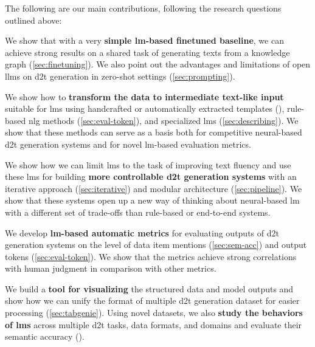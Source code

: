 The following are our main contributions, following the research questions outlined above:

\begin{description}[leftmargin=\widthof{\textbf{Ad RQ1\ \ }}]
  \item[Ad \ref{rq:1}] We show that  with a very \textbf{simple \ac{lm}-based finetuned baseline}, we can achieve strong results on a shared task of generating texts from a knowledge graph (\autoref{sec:finetuning}). We also point out the advantages and limitations of open \acp{llm} on \ac{d2t} generation in zero-shot settings (\autoref{sec:prompting}).
  \item[Ad \ref{rq:2}] We show how to \textbf{transform the data to intermediate text-like input} suitable for \acp{lm} using handcrafted or automatically extracted templates (), rule-based \ac{nlg} methods (\autoref{sec:eval-token}), and specialized \acp{lm} (\autoref{sec:describing}). We show that these methods can serve as a basis both for competitive neural-based \ac{d2t} generation systems and for novel \ac{lm}-based evaluation metrics.
  \item[Ad \ref{rq:3}] We show how we can limit \acp{lm} to the task of improving text fluency and use these \acp{lm} for building \textbf{more controllable \ac{d2t} generation systems} with an iterative approach (\autoref{sec:iterative}) and modular architecture (\autoref{sec:pipeline}). We show that these systems open up a new way of thinking about neural-based \ac{lm} with a different set of trade-offs than rule-based or end-to-end systems.
  \item[Ad \ref{rq:4}] We develop \textbf{\ac{lm}-based automatic metrics} for evaluating outputs of \ac{d2t} generation systems on the level of data item mentions (\autoref{sec:sem-acc}) and output tokens (\autoref{sec:eval-token}). We show that the metrics achieve strong correlations with human judgment in comparison with other metrics.
  \item[Ad \ref{rq:5}] We build a \textbf{tool for visualizing} the structured data and model outputs and show how we can unify the format of multiple \ac{d2t} generation dataset for easier processing (\autoref{sec:tabgenie}). Using novel datasets, we also \textbf{study the behaviors of \acp{lm}} across multiple \ac{d2t} tasks, data formats, and domains and evaluate their semantic accuracy ().
\end{description}



